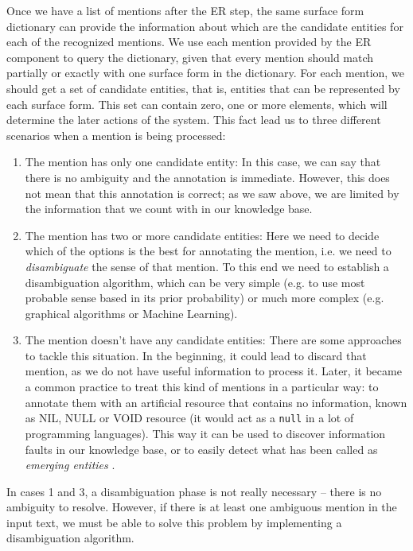 Once we have a list of mentions after the ER step, the same surface form dictionary can provide the information about which are the candidate entities for each of the recognized mentions. We use each mention provided by the ER component to query the dictionary, given that every mention should match partially or exactly with one surface form in the dictionary. For each mention, we should get a set of candidate entities, that is, entities that can be represented by each surface form. This set can contain zero, one or more elements, which will determine the later actions of the system. This fact lead us to three different scenarios when a mention is being processed:

\begin{enumerate}
\item The mention has only one candidate entity: In this case, we can say that there is no ambiguity and the annotation is immediate. However, this does not mean that this annotation is correct; as we saw above, we are limited by the information that we count with in our knowledge base.
\item The mention has two or more candidate entities: Here we need to decide which of the options is the best for annotating the mention, i.e. we need to \emph{disambiguate} the sense of that mention. To this end we need to establish a disambiguation algorithm, which can be  very simple (e.g. to use most probable sense based in its prior probability) or much more complex (e.g. graphical algorithms or Machine Learning).
\item The mention doesn't have any candidate entities: There are some approaches to tackle this situation. In the beginning, it could lead to discard that mention, as we do not have useful information to process it. Later, it became a common practice to treat this kind of mentions in a particular way: to annotate them with an artificial resource that contains no information, known as NIL, NULL or VOID resource (it would act as a \texttt{null} in a lot of programming languages). This way it can be used to discover information faults in our knowledge base, or to easily detect what has been called as \emph{emerging entities} \cite{hoffart2015}.
\end{enumerate}

In cases 1 and 3, a disambiguation phase is not really necessary -- there is no ambiguity to resolve. However, if there is at least one ambiguous mention in the input text, we must be able to solve this problem by implementing a disambiguation algorithm.

